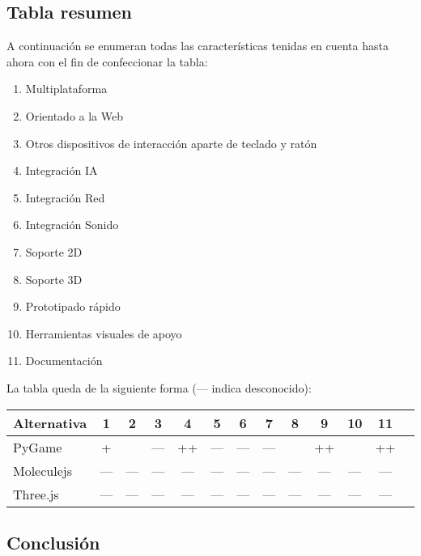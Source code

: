 \documentclass[a4paper]{article}
\begin{document}
\subsection{Tabla resumen}
A continuación se enumeran todas las características tenidas en cuenta hasta ahora con el fin de confeccionar la tabla:
\begin{enumerate}
\item Multiplataforma
\item Orientado a la Web
\item Otros dispositivos de interacción aparte de teclado y ratón
\item Integración IA
\item Integración Red
\item Integración Sonido
\item Soporte 2D
\item Soporte 3D
\item Prototipado rápido
\item Herramientas visuales de apoyo
\item Documentación
\end{enumerate}

La tabla queda de la siguiente forma (--- indica desconocido):
\begin{center}
\begin{tabular}{ |l| *{12}{c|} }
\hline
Alternativa  & 1 & 2 & 3 & 4 & 5 & 6 & 7 & 8 & 9 & 10 & 11 \\ \hline \hline
PyGame & +& & ---& ++& ---& ---& ---& & ++& & ++\\
Moleculejs & ---& ---& ---& ---& ---& ---& ---& ---& ---& ---& ---\\
Three.js & ---& ---& ---& ---& ---& ---& ---& ---& ---& ---& ---\\
\hline
\end{tabular}
\end{center}

\subsection{Conclusión}
\end{document}
